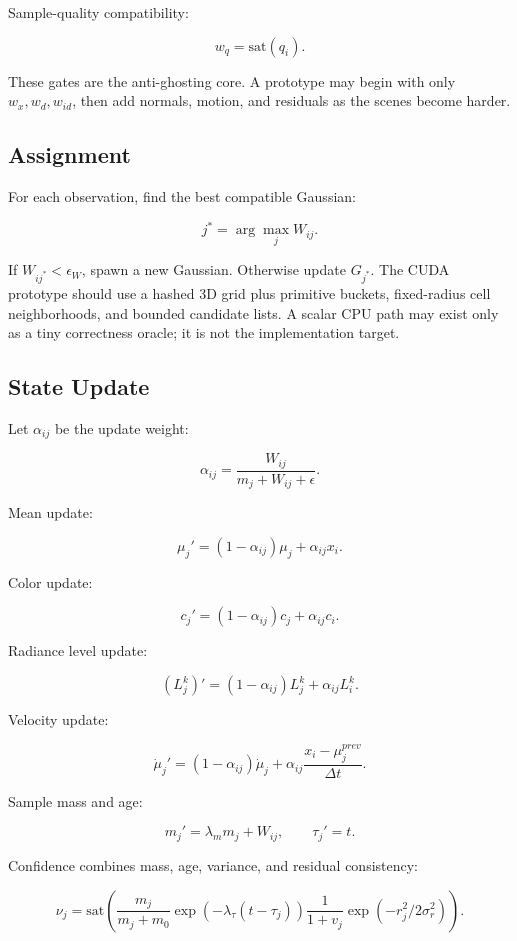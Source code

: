 \documentclass[11pt]{article}
\begin{document}
Sample-quality compatibility:

\[
  w_q = \mathrm{sat}(q_i).
\]

These gates are the anti-ghosting core. A prototype may begin with only
$w_x,w_d,w_{id}$, then add normals, motion, and residuals as the scenes become
harder.

\subsection{Assignment}

For each observation, find the best compatible Gaussian:

\[
  j^* = \arg\max_j W_{ij}.
\]

If $W_{ij^*} < \epsilon_W$, spawn a new Gaussian. Otherwise update $G_{j^*}$.
The CUDA prototype should use a hashed 3D grid plus primitive buckets,
fixed-radius cell neighborhoods, and bounded candidate lists. A scalar CPU path
may exist only as a tiny correctness oracle; it is not the implementation
target.

\subsection{State Update}

Let $\alpha_{ij}$ be the update weight:

\[
  \alpha_{ij} =
  \frac{W_{ij}}{m_j + W_{ij} + \epsilon}.
\]

Mean update:

\[
  \mu_j' = (1-\alpha_{ij})\mu_j + \alpha_{ij}x_i.
\]

Color update:

\[
  c_j' = (1-\alpha_{ij})c_j + \alpha_{ij}c_i.
\]

Radiance level update:

\[
  (L_j^k)' = (1-\alpha_{ij})L_j^k + \alpha_{ij}L_i^k.
\]

Velocity update:

\[
  \dot{\mu}_j' =
  (1-\alpha_{ij})\dot{\mu}_j
  + \alpha_{ij}\frac{x_i-\mu_j^{prev}}{\Delta t}.
\]

Sample mass and age:

\[
  m_j' = \lambda_m m_j + W_{ij},
  \qquad
  \tau_j' = t.
\]

Confidence combines mass, age, variance, and residual consistency:

\[
  \nu_j =
  \mathrm{sat}\left(
    \frac{m_j}{m_j + m_0}
    \exp(-\lambda_\tau(t-\tau_j))
    \frac{1}{1+v_j}
    \exp(-r_j^2 / 2\sigma_r^2)
  \right).
\]
\end{document}
